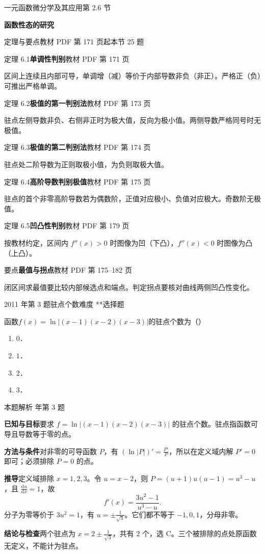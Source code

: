 \documentclass[UTF8,zihao=-4,fontset=fandol]{ctexart}
\newcommand{\SectionHeading}[4]{%
  \clearpage\hypertarget{sec-#1}{}%
  {\small\textcolor{accent}{#2\hfill 第 #1 节}}\par\medskip
  {\LARGE\bfseries #3}\par\smallskip
  {\small\textcolor{muted}{#4}}\par\bigskip}
\newcommand{\Theory}[4]{%
  {\small\textcolor{accent}{#1}\quad\textbf{#3}\hfill\textcolor{muted}{教材 PDF 第 #2 页}}\par
  {\small #4}\par\smallskip}
\newcommand{\pickout}{\hfill（\hspace{1.4em}）}
\newenvironment{abcd}{\begin{enumerate}[label=\textup{(\Alph*)},leftmargin=2.3em,itemsep=1pt,topsep=4pt,parsep=1pt]}{\end{enumerate}}
\newcounter{BankQuestion}
\newcommand{\QuestionPage}[7]{%
  \stepcounter{BankQuestion}%
  \par\noindent\begin{minipage}{\linewidth}
  \raggedright
  {\small\textcolor{black!60}{#3\quad #5\quad 难度 #7}\hfill\textcolor{accent}{#2}}\par\smallskip}
\newcommand{\QuestionEnd}{\end{minipage}\par\medskip}
\newcommand{\QuestionPage}[7]{%
  \clearpage
  \stepcounter{BankQuestion}%
  {\small\textcolor{accent}{#1\hfill #2}}\par\medskip
  {\small\textcolor{black!60}{#3\quad #5\quad 难度 #7\hfill \arabic{BankQuestion} / 234}}\par\vspace{9bp}}
\newcommand{\QuestionEnd}{}
\newenvironment{QuestionSolution}[1]{%
  \clearpage
  {\small\textcolor{black!60}{本题解析\quad #1}}\par\medskip
}{\par\clearpage}
\begin{document}
\SectionHeading{2.6}{一元函数微分学及其应用}{函数性态的研究}{定理与要点\quad 教材 PDF 第 171 页起\hfill 本节 25 题}
\Theory{定理 6.1}{171}{单调性判别}{区间上连续且内部可导，单调增（减）等价于内部导数非负（非正）。严格正（负）可推出严格单调。}
\Theory{定理 6.2}{173}{极值的第一判别法}{驻点左侧导数非负、右侧非正时为极大值，反向为极小值。两侧导数严格同号时无极值。}
\Theory{定理 6.3}{174}{极值的第二判别法}{驻点处二阶导数为正则取极小值，为负则取极大值。}
\Theory{定理 6.4}{175}{高阶导数判别极值}{驻点的首个非零高阶导数若为偶数阶，正值对应极小、负值对应极大。奇数阶无极值。}
\Theory{定理 6.5}{179}{凹凸性判别}{按教材约定，区间内 \(f''(x)>0\) 时图像为凹（下凸），\(f''(x)<0\) 时图像为凸（上凸）。}
\Theory{要点}{175--182}{最值与拐点}{闭区间求最值要比较内部候选点和端点。判定拐点要核对曲线两侧凹凸性变化。}
\QuestionPage{2.6 函数性态的研究}{选择题}{2011 年第 3 题}{1}{驻点个数}{105 / 234}{**}
函数$f(x) = \ln \left| (x - 1)(x - 2)(x - 3) \right|$的驻点个数为\pickout{}
\begin{abcd}
\item $0$．
\item $1$．
\item $2$．
\item $3$．
\end{abcd}
\QuestionEnd

\begin{QuestionSolution}{2011 年第 3 题}
\textbf{已知与目标}\quad 要求 \(f=\ln|(x-1)(x-2)(x-3)|\) 的驻点个数。驻点指函数可导且导数等于零的点。

\textbf{方法与条件}\quad 对非零的可导函数 \(P\)，有 \((\ln|P|)'=\frac{P'}P\)，所以在定义域内解 \(P'=0\) 即可；必须排除 \(P=0\) 的点。

\textbf{推导}\quad 定义域排除 \(x=1,2,3\)。令 \(u=x-2\)，则 \(P=(u+1)u(u-1)=u^3-u\)，且 \(\frac{\mathrm du}{\mathrm dx}=1\)，故
\[
f'(x)=\frac{3u^2-1}{u^3-u}.
\]
分子为零等价于 \(3u^2=1\)，有 \(u=\pm\frac1{\sqrt3}\)。它们都不等于 \(-1,0,1\)，分母非零。

\textbf{结论与检查}\quad 两个驻点为 \(x=2\pm\frac1{\sqrt3}\)，共有 \(\boxed{2}\) 个，选 C。三个被排除的点处原函数无定义，不能计为驻点。
\end{QuestionSolution}
\end{document}
